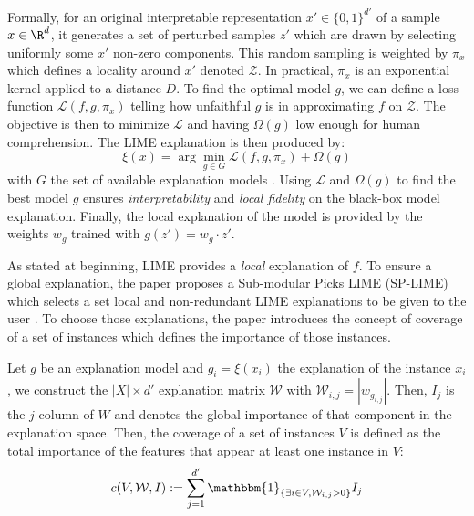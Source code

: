 Formally, for an original interpretable representation $x' \in \{0, 1\}^{d'}$ of a
sample $x \in \R^d$, it generates a set of perturbed samples $z'$ which are drawn
by selecting uniformly some $x'$ non-zero components. This random sampling is weighted by 
$\pi_x$ which defines a locality around $x'$ denoted $ \mathcal{Z}$. In practical, 
$ \pi_x$ is an exponential kernel applied to a distance $D$. 
To find the optimal model $g$, we can define a loss function $ \mathcal{L}(f,g, \pi_x)$ telling how 
unfaithful $g$ is in approximating $f$ on $ \mathcal{Z}$. The objective is then to 
minimize $ \mathcal{L}$ and having $ \Omega(g)$ low enough for human comprehension. 
The LIME explanation is then produced by: 
\begin{equation}
    \xi(x) = \arg \min_{g \in G} \mathcal{L}(f,g, \pi_x) + \Omega(g)
\end{equation}
with $G$ the set of available explanation models \cite{ribeiro_why_2016}. Using $ \mathcal{L}$ and $ \Omega(g)$ 
to find the best model $g$ ensures \emph{interpretability} and \emph{local fidelity}
on the black-box model explanation. Finally, the local explanation of the model 
is provided by the weights $w_g$ trained with $g(z') = w_g \cdot z'$.

As stated at beginning, LIME provides a \emph{local} explanation of $f$. To ensure 
a global explanation, the paper proposes a Sub-modular Picks LIME (SP-LIME) 
which selects a set local and non-redundant LIME explanations to be given to the user \cite{ribeiro_why_2016}.
To choose those explanations, the paper introduces the concept of coverage of a set 
of instances which defines the importance of those instances. 

\begin{definition}[Coverage]
    Let $g$ be an explanation model and $ g_i = \xi(x_i)$ the explanation 
    of the instance $x_i$, we construct the $|X| \times d'$ explanation matrix $ \mathcal{W}$ 
    with $ \mathcal{W}_{i,j} = | w_{g_{i,j}} |$. Then, $I_j$ is the $j$-column of 
    $W$ and denotes the global importance of that component in the explanation space. 
    Then, the coverage of a set of instances $V$ is defined as the total importance 
    of the features that appear at least one instance in $V$: 
    \begin{equation}
        c(V, \mathcal{W}, I) := \sum_{j=1}^{d'} \mathbbm{1}_{\{ \exists i \in V, \mathcal{W}_{i,j} > 0\}} I_j  
    \end{equation}
\end{definition}

